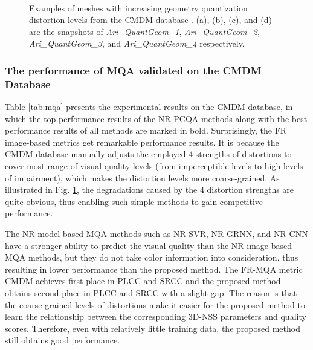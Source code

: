 \documentclass[lettersize,journal]{IEEEtran}
\begin{document}
\begin{figure}[tbp]
\centering
{}\\


\caption{Examples of meshes with increasing geometry quantization distortion levels from the CMDM database \cite{database}. (a), (b), (c), and (d) are the snapshots of \textit{Ari\_QuantGeom\_1}, \textit{Ari\_QuantGeom\_2}, \textit{Ari\_QuantGeom\_3}, and \textit{Ari\_QuantGeom\_4} respectively. }

\label{fig:ari}
\vspace{-0.5cm}
\end{figure}



\subsubsection{The performance of MQA validated on the CMDM Database}
{Table \ref{tab:mqa} presents the experimental results on the CMDM database, in which the top performance results of the NR-PCQA methods along with the best performance results of all methods are marked in bold. Surprisingly, the FR image-based metrics get remarkable performance results. It is because the CMDM database manually adjusts the employed 4 strengths of distortions to cover most range of visual quality levels (from imperceptible levels to high levels of impairment), which makes the distortion levels more coarse-grained. As illustrated in Fig. \ref{fig:ari}, the degradations caused by the 4 distortion strengths are quite obvious, thus enabling such simple methods to gain competitive performance. 

The NR model-based MQA methods such as NR-SVR, NR-GRNN, and NR-CNN have a stronger ability to predict the visual quality than the NR image-based MQA methods, but they do not take color information into consideration, thus resulting in lower performance than the proposed method. The FR-MQA metric CMDM achieves first place in PLCC and SRCC and the proposed method obtains second place in PLCC and SRCC with a slight gap. The reason is that the coarse-grained levels of distortions make it easier for the proposed method to learn the relationship between the corresponding 3D-NSS parameters and quality scores. Therefore, even with relatively little training data, the proposed method still obtains good performance.}
\end{document}
